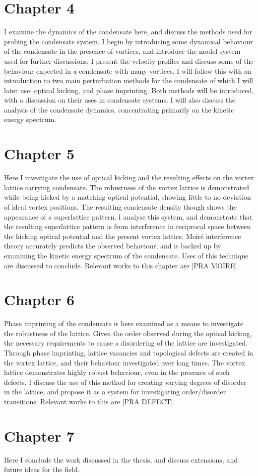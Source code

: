 \section{Chapter 4}
I examine the dynamics of the condensate here, and discuss the methods used for probing the condensate system. I begin by introducing some dynamical behaviour of the condensate in the presence of vortices, and introduce the model system used for further discussions. I present the velocity profiles and discuss some of the behaviour expected in a condensate with many vortices. I will follow this with an introduction to two main perturbation methods for the condensate of which I will later use: optical kicking, and phase imprinting. Both methods will be introduced, with a discussion on their uses in condensate systems. I will also discuss the analysis of the condensate dynamics, concentrating primarily on the kinetic energy spectrum.

\section{Chapter 5}
Here I investigate the use of optical kicking and the resulting effects on the vortex lattice carrying condensate. The robustness of the vortex lattice is demonstrated while being kicked by a matching optical potential, showing little to no deviation of ideal vortex positions. The resulting condensate density though shows the appearance of a superlattice pattern. I analyse this system, and demonstrate that the resulting superlattice pattern is from interference in reciprocal space between the kicking optical potential and the present vortex lattice. Moir\'e interference theory accurately predicts the observed behaviour, and is backed up by examining the kinetic energy spectrum of the condensate. Uses of this technique are discussed to conclude. Relevant works to this chapter are [PRA MOIRE]\cite{}.

\section{Chapter 6}
Phase imprinting of the condensate is here examined as a means to investigate the robustness of the lattice. Given the order observed during the optical kicking, the necessary requirements to cause a disordering of the lattice are investigated. Through phase imprinting, lattice vacancies and topological defects are created in the vortex lattice, and their behaviour investigated over long times. The vortex lattice demonstrates highly robust behaviour, even in the presence of such defects. I discuss the use of this method for creating varying degrees of disorder in the lattice, and propose it as a system for investigating order/disorder transitions. Relevant works to this are [PRA DEFECT]\cite{}.

\section{Chapter 7}
Here I conclude the work discussed in the thesis, and discuss extensions, and future ideas for the field.
